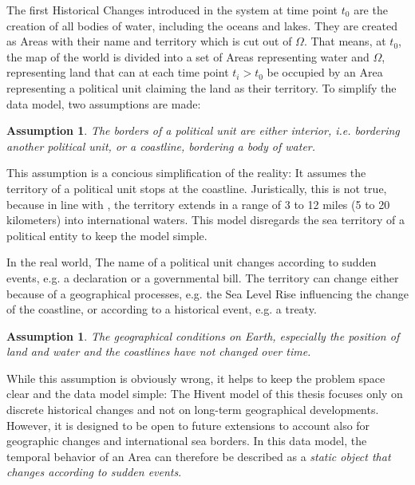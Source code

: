 The first Historical Changes introduced in the system at time point $t_0$ are the creation of all bodies of water, including the oceans and lakes. They are created as Areas with their name and territory which is cut out of $\Omega$. That means, at $t_0$, the map of the world is divided into a set of Areas representing water and $\Omega$, representing land that can at each time point $t_i > t_0$ be occupied by an Area representing a political unit claiming the land as their territory. To simplify the data model, two assumptions are made:

\newtheorem{international_borders}[assicounter]{Assumption}
\begin{international_borders}
\label{axm:international_borders}
  The borders of a political unit are either \emph{interior}, i.e. bordering another political unit, or a \emph{coastline}, bordering a body of water.
\end{international_borders}

This assumption is a concious simplification of the reality: It assumes the territory of a political unit stops at the coastline. Juristically, this is not true, because in line with \cite{UNSeaBorders}, the territory extends in a range of 3 to 12 miles (5 to 20 kilometers) into international waters. This model disregards the sea territory of a political entity to keep the model simple.

In the real world, The name of a political unit changes according to sudden events, e.g. a declaration or a governmental bill. The territory can change either because of a geographical processes, e.g. the Sea Level Rise influencing the change of the coastline, or according to a historical event, e.g. a treaty.

\newtheorem{constant_coastlines}[assicounter]{Assumption}
\begin{constant_coastlines}
\label{axm:constant_coastlines}
  The geographical conditions on Earth, especially the position of land and water and the coastlines have not changed over time.
\end{constant_coastlines}

While this assumption is obviously wrong, it helps to keep the problem space clear and the data model simple: The Hivent model of this thesis focuses only on discrete historical changes and not on long-term geographical developments.  However, it is designed to be open to future extensions to account also for geographic changes and international sea borders. In this data model, the temporal behavior of an Area can therefore be described as a \emph{static object that changes according to sudden events}.


